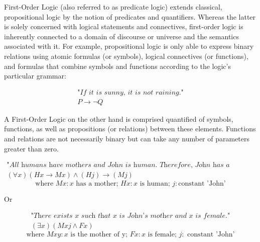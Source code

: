 
First-Order Logic (also referred to as predicate logic) extends classical, propositional logic by the notion of predicates and quantifiers.
Whereas the latter is solely concerned with logical statements and connectives, first-order logic is inherently connected to a domain of discourse or universe and the semantics associated with it.
For example, propositional logic is only able to express binary relations using atomic formulas (or symbols), logical connectives (or functions), and formulas that combine symbols and functions according to the logic's particular grammar:

\begin{equation*}
    \begin{gathered}
        \textit{"If it is sunny, it is not raining."}\\
        P \rightarrow \lnot Q
    \end{gathered}
\end{equation*}

A First-Order Logic on the other hand is comprised quantified of symbols, functions, as well as propositions (or relations) between these elements.
Functions and relations are not necessarily binary but can take any number of parameters greater than zero.

\begin{equation*}
    \begin{gathered}
        \textit{"All humans have mothers and John is human. Therefore, John has a mother."}\\
        (\forall x)(Hx \rightarrow Mx) \wedge (Hj) \rightarrow (Mj)
    \end{gathered}
\end{equation*}
\begin{equation*}
    \text{where }
    Mx: x \text{ has a mother; }
    Hx: x \text{ is human; }
    j: \text{constant 'John'}
\end{equation*}

Or

\begin{equation*}
    \begin{gathered}
        \textit{"There exists x such that x is John's mother and x is female."}\\
        (\exists x)(Mxj \wedge Fx)
    \end{gathered}
\end{equation*}
\begin{equation*}
    \text{where }
    Mxy: x \text{ is the mother of y; }
    Fx: x \text{ is female; }
    j: \text{ constant 'John'}
\end{equation*}


